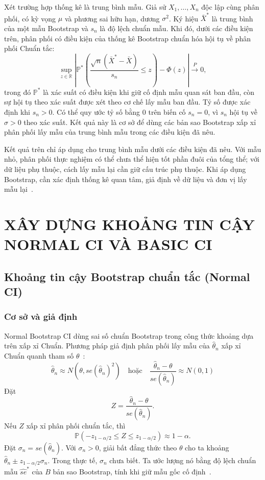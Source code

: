 \documentclass[12pt,a4paper]{article}
\theoremstyle{definition}
\numberwithin{equation}{section}
\begin{document}
Xét trường hợp thống kê là trung bình mẫu. Giả sử
$X_1,\ldots,X_n$ độc lập cùng phân phối, có kỳ vọng $\mu$ và phương sai
hữu hạn, dương $\sigma^2$. Ký hiệu $\bar{X}^*$ là trung bình của một mẫu
Bootstrap và $s_n$ là độ lệch chuẩn mẫu. Khi đó, dưới các điều kiện trên,
phân phối có điều kiện của thống kê Bootstrap chuẩn hóa hội tụ về phân
phối Chuẩn tắc:
\begin{equation}
	\sup_{z\in\mathbb{R}}
	\left|
	\mathbb{P}^*\left(
	\frac{\sqrt{n}(\bar{X}^*-\bar{X})}{s_n}\leq z
	\right)
	-\Phi(z)
	\right|
	\xrightarrow{P} 0,
\end{equation}
trong đó $\mathbb{P}^*$ là xác suất có điều kiện khi giữ cố định mẫu quan
sát ban đầu, còn sự hội tụ theo xác suất được xét theo cơ chế lấy mẫu ban
đầu. Tỷ số được xác định khi $s_n>0$. Có thể quy ước tỷ số bằng $0$ trên
biến cố $s_n=0$, vì $s_n$ hội tụ về $\sigma>0$ theo xác suất. Kết quả này là cơ sở để dùng các bản sao Bootstrap xấp xỉ phân phối
lấy mẫu của trung bình mẫu trong các điều kiện đã nêu.

Kết quả trên chỉ áp dụng cho trung bình mẫu dưới các điều kiện đã nêu.
Với mẫu nhỏ, phân phối thực nghiệm có thể chưa thể hiện tốt phần đuôi của
tổng thể; với dữ liệu phụ thuộc, cách lấy mẫu lại cần giữ cấu trúc phụ
thuộc. Khi áp dụng Bootstrap, cần xác định thống kê quan tâm, giả định về
dữ liệu và đơn vị lấy mẫu lại~\cite{davison1997,bickelfreedman1981}.


	\newpage
	\section{XÂY DỰNG KHOẢNG TIN CẬY NORMAL CI VÀ BASIC CI}

	\subsection{Khoảng tin cậy Bootstrap chuẩn tắc (Normal CI)}

	\subsubsection{Cơ sở và giả định}
	Normal Bootstrap CI dùng sai số chuẩn Bootstrap trong công thức khoảng dựa trên xấp xỉ Chuẩn. Phương pháp giả định phân phối lấy mẫu của $\hat{\theta}_n$ xấp xỉ Chuẩn quanh tham số $\theta$~\cite{buithuytrang2026,rizzo2019,efron1993}:
	\begin{equation}
		\hat{\theta}_n \approx N\left(\theta, se(\hat{\theta}_n)^2\right) \quad \text{hoặc} \quad \frac{\hat{\theta}_n - \theta}{se(\hat{\theta}_n)} \approx N(0, 1)
	\end{equation}
	Đặt
	\[
	Z=\frac{\hat{\theta}_n-\theta}{se(\hat{\theta}_n)}.
	\]
	Nếu $Z$ xấp xỉ phân phối chuẩn tắc, thì
	\[
	\mathbb{P}\left(
	-z_{1-\alpha/2}\leq Z\leq z_{1-\alpha/2}
	\right)\approx 1-\alpha.
	\]
    Đặt $\sigma_n=se(\hat{\theta}_n)$. Với $\sigma_n>0$, giải bất đẳng thức theo
    $\theta$ cho ta khoảng $\hat{\theta}_n\pm z_{1-\alpha/2}\sigma_n$.
    Trong thực tế, $\sigma_n$ chưa biết. Ta ước lượng nó bằng độ lệch chuẩn
    mẫu $\widehat{se}^*$ của $B$ bản sao Bootstrap, tính khi giữ mẫu gốc cố định~\cite[tr.~47, 154]{efron1993}.
\end{document}
